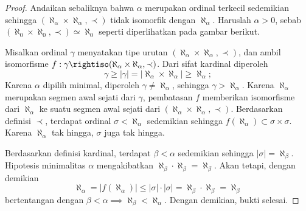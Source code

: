 \begin{proof}
	Andaikan sebaliknya bahwa $\alpha$ merupakan ordinal terkecil sedemikian sehingga $(\aleph_\alpha \times \aleph_\alpha, \prec)$ tidak isomorfik dengan $\aleph_\alpha$. Haruslah $\alpha > 0$, sebab $(\aleph_0 \times \aleph_0, \prec) \simeq \aleph_0$ seperti diperlihatkan pada gambar berikut.
	\begin{center} \qquad {}\end{center}
	Misalkan ordinal $\gamma$ menyatakan tipe urutan $(\aleph_\alpha \times \aleph_\alpha, \prec)$, dan ambil isomorfisme $f: \gamma \rightiso (\aleph_\alpha \times \aleph_\alpha, \prec)$. Dari sifat kardinal diperoleh
	\[ \gamma \geq |\gamma| = |\aleph_\alpha \times \aleph_\alpha| \geq \aleph_\alpha; \]
	Karena $\alpha$ dipilih minimal, diperoleh $\gamma \neq \aleph_\alpha$, sehingga $\gamma > \aleph_\alpha$. Karena $\aleph_\alpha$ merupakan segmen awal sejati dari $\gamma$, pembatasan $f$ memberikan isomorfisme dari $\aleph_\alpha$ ke suatu segmen awal sejati dari $(\aleph_\alpha \times \aleph_\alpha, \prec)$. Berdasarkan definisi $\prec$, terdapat ordinal $\sigma < \aleph_\alpha$ sedemikian sehingga $f(\aleph_\alpha) \subset \sigma \times \sigma$. Karena $\aleph_\alpha$ tak hingga, $\sigma$ juga tak hingga.
	
	Berdasarkan definisi kardinal, terdapat $\beta < \alpha$ sedemikian sehingga $|\sigma| = \aleph_\beta$. Hipotesis minimalitas $\alpha$ mengakibatkan $\aleph_\beta \cdot \aleph_\beta = \aleph_\beta$. Akan tetapi, dengan demikian
	\[ \aleph_\alpha = |f(\aleph_\alpha)| \leq |\sigma| \cdot |\sigma| = \aleph_\beta \cdot \aleph_\beta = \aleph_\beta \]
	bertentangan dengan $\beta < \alpha \implies \aleph_\beta < \aleph_\alpha$. Dengan demikian, bukti selesai.
\end{proof}

